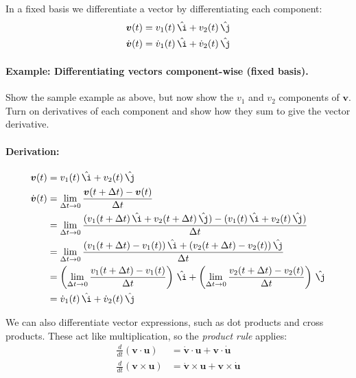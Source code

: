 \documentclass{article}
\renewcommand{\vec}[1]{\boldsymbol{#1}}
\newcommand{\unit}[1]{\,\hat{#1}}
\begin{document}
In a fixed basis we differentiate a vector by differentiating each
component:
\begin{align}
  \vec{v}(t) &= v_1(t) \unit{\i} + v_2(t) \unit{\j} \\
  \dot{\vec{v}}(t) &= \dot{v}_1(t) \unit{\i} + \dot{v}_2(t) \unit{\j}
\end{align}

\paragraph{Example: Differentiating vectors component-wise (fixed basis).} Show the
sample example as above, but now show the $v_1$ and $v_2$ components
of $\vec{v}$. Turn on derivatives of each component and show how they
sum to give the vector derivative.

\paragraph{Derivation:}
\begin{align}
  \vec{v}(t) &= v_1(t) \unit{\i} + v_2(t) \unit{\j} \\
  \dot{\vec{v}}(t) &= \lim_{\Delta t \to 0}
  \frac{\vec{v}(t + \Delta t) - \vec{v}(t)}{\Delta t} \\
  &= \lim_{\Delta t \to 0}
  \frac{(v_1(t + \Delta t) \unit{\i} + v_2(t + \Delta t) \unit{\j})
    - (v_1(t) \unit{\i} + v_2(t) \unit{\j})}{\Delta t} \\
  &= \lim_{\Delta t \to 0}
  \frac{(v_1(t + \Delta t) - v_1(t)) \unit{\i}
    + (v_2(t + \Delta t) - v_2(t)) \unit{\j}}{\Delta t} \\
  &= \left(\lim_{\Delta t \to 0}
    \frac{v_1(t + \Delta t) - v_1(t)}{\Delta t} \right) \unit{\i}
  + \left(\lim_{\Delta t \to 0}
    \frac{v_2(t + \Delta t) - v_2(t) }{\Delta t}\right) \unit{\j} \\
  &= \dot{v}_1(t) \unit{\i} + \dot{v}_2(t) \unit{\j}
\end{align}

We can also differentiate vector expressions, such as dot products and
cross products. These act like multiplication, so the \emph{product
  rule} applies:
\begin{align}
  \frac{d}{dt}(\vec{v} \cdot \vec{u})
  &= \dot{\vec{v}} \cdot \vec{u} + \vec{v} \cdot \dot{\vec{u}} \\
  \frac{d}{dt}(\vec{v} \times \vec{u})
  &= \dot{\vec{v}} \times \vec{u} + \vec{v} \times \dot{\vec{u}}
\end{align}
\end{document}

